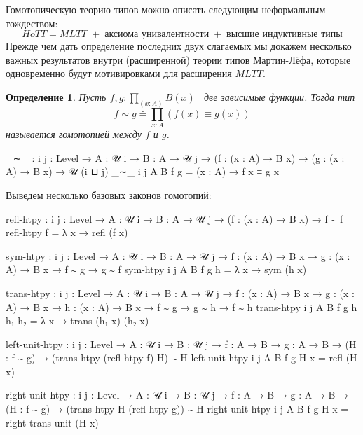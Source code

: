 \documentclass{article}[12pt]
\newtheorem{definition}{Определение}
\newcommand{\dash}{\textemdash\ }
\begin{document}
Гомотопическую теорию типов можно описать следующим неформальным тождеством:
$$HoTT = MLTT \; + \; \text{аксиома унивалентности} \;  + \; \text{высшие индуктивные типы}$$
Прежде чем дать определение последних двух слагаемых мы докажем несколько важных результатов
внутри (расширенной) теории типов Мартин-Лёфа, которые одновременно будут мотивировками для расширения $MLTT$.

\begin{definition}
    \label{HomotopyDefinition}
    Пусть $f, g : \prod_{(x : A)} B(x)$ \dash две зависимые функции. Тогда тип
    $$f \sim g \doteq \prod_{x : A} (f(x) \equiv g(x))$$
    называется гомотопией между $f$ и $g$.
\end{definition}
\begin{code}
_∼_ : {i j : Level} → {A : 𝒰 i} → {B : A → 𝒰 j}
      → (f : (x : A) → B x)
      → (g : (x : A) → B x)
      → 𝒰 (i ⊔ j)
_∼_ {i} {j} {A} {B} f g = (x : A) → f x ≡ g x
\end{code}

Выведем несколько базовых законов гомотопий:
\begin{code}
refl-htpy : {i j : Level} → {A : 𝒰 i} → {B : A → 𝒰 j}
            → (f : (x : A) → B x)
            → f ∼ f
refl-htpy f = λ x → refl (f x)

sym-htpy : {i j : Level} → {A : 𝒰 i} → {B : A → 𝒰 j}
           → {f : (x : A) → B x}
           → {g : (x : A) → B x}
           → f ∼ g → g ∼ f
sym-htpy {i} {j} {A} {B} {f} {g} h = λ x → sym (h x)

trans-htpy : {i j : Level} → {A : 𝒰 i} → {B : A → 𝒰 j}
             → {f : (x : A) → B x}
             → {g : (x : A) → B x}
             → {h : (x : A) → B x}
             → f ∼ g → g ∼ h
             → f ∼ h
trans-htpy {i} {j} {A} {B} {f} {g} {h} h₁ h₂ = λ x → trans (h₁ x) (h₂ x)

left-unit-htpy : {i j : Level} → {A : 𝒰 i} → {B : 𝒰 j}
                 → {f : A → B} → {g : A → B}
                 → (H : f ∼ g)
                 → (trans-htpy (refl-htpy f) H) ∼ H
left-unit-htpy {i} {j} {A} {B} {f} {g} H x = refl (H x)

right-unit-htpy : {i j : Level} → {A : 𝒰 i} → {B : 𝒰 j}
                  → {f : A → B} → {g : A → B}
                  → (H : f ∼ g)
                  → (trans-htpy H (refl-htpy g)) ∼ H
right-unit-htpy {i} {j} {A} {B} {f} {g} H x = right-trans-unit (H x)
\end{code}
\end{document}
